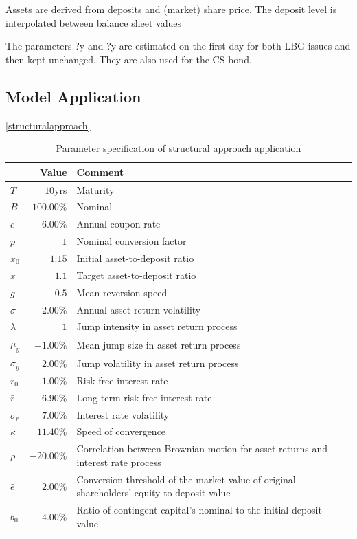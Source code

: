 Assets are derived from deposits and (market) share price. The deposit level is interpolated between balance sheet values

The parameters ?y and ?y are estimated on the first day for both LBG issues and then kept unchanged. They are also used for the CS bond.

\subsection{Model Application}

\ref{structuralapproach}

\begin{table}[H]
	\setlength{\extrarowheight}{2.5pt}
	\centering
	\begin{tabular}{lrp{10cm}}
		\toprule
			 & Value & Comment \\
		\midrule
			$T$ & $10$yrs & Maturity \\
			$B$ & $100.00\%$ & Nominal \\
			$c$ & $6.00\%$ & Annual coupon rate \\
			$p$ & $1$ & Nominal conversion factor\\
			$x_0$ & $1.15$ & Initial asset-to-deposit ratio\\
			$\hat{x}$ & $1.1$ & Target asset-to-deposit ratio\\
			$g$ & $0.5$ & Mean-reversion speed \\
			$\sigma$ & $2.00\%$ & Annual asset return volatility \\
			$\lambda$ & $1$& Jump intensity in asset return process\\			
			$\mu_y$ &$-1.00\%$ & Mean jump size in asset return process\\
			$\sigma_y$ &$2.00\%$ & Jump volatility in asset return process\\		
			$r_0$ & $1.00 \%$ & Risk-free interest rate\\
			$\bar{r}$ & $ 6.90\%$ & Long-term risk-free interest rate\\
			$\sigma_r$ & $7.00\%$ & Interest rate volatility \\
			$\kappa$ & $11.40\%$ & Speed of convergence \\
			$\rho$ & $-20.00\%$ & Correlation between Brownian motion for asset returns and interest rate process\\
			$\bar{e}$ & $2.00\%$ & Conversion threshold of the market value of original shareholders' equity to deposit value\\
			$b_0$ & $4.00\%$ & Ratio of contingent capital's nominal to the initial deposit value\\
		\bottomrule
	\end{tabular}
	\caption[Parameter specification of structural approach application]{Parameter specification of structural approach application \citep{alvemar2012modelling, pennacchi2010structural}}
\end{table}


